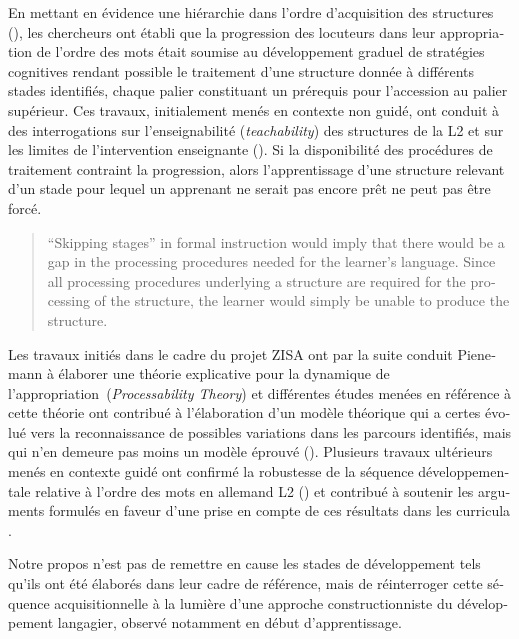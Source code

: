 \documentclass[output=paper]{langscibook}
\begin{document}
\begin{otherlanguage}{french}
En mettant en évidence une hiérarchie dans l’ordre d’acquisition des structures (), les chercheurs ont établi que la progression des locuteurs dans leur appropriation de l’ordre des mots était soumise au développement graduel de stratégies cognitives rendant possible le traitement d’une structure donnée à différents stades identifiés, chaque palier constituant un prérequis pour l’accession au palier supérieur. Ces travaux, initialement menés en contexte non guidé, ont conduit à des interrogations sur l’enseignabilité (\textit{teachability}) des structures de la L2 et sur les limites de l’intervention enseignante (\citealt{Pienemann1984, Pienemann1989, Ellis1989}). Si la disponibilité des procédures de traitement contraint la progression, alors l’apprentissage d’une structure relevant d’un stade pour lequel un apprenant ne serait pas encore prêt ne peut pas être forcé.

\begin{quote}
\begin{otherlanguage}{english}
“Skipping stages” in formal instruction would imply that there would be a gap in the processing procedures needed for the learner’s language. Since all processing procedures underlying a structure are required for the processing of the structure, the learner would simply be unable to produce the structure.\hbox{}\hfill\hbox{\citep[13]{Pienemann1999}}
\end{otherlanguage}
\end{quote}

Les travaux initiés dans le cadre du projet ZISA ont par la suite conduit Pienemann à élaborer une théorie explicative pour la dynamique de l’appropriation~(\textit{Processability Theory}) et différentes études menées en référence à cette théorie ont contribué à l’élaboration d’un modèle théorique qui a certes évolué vers la reconnaissance de possibles variations dans les parcours identifiés, mais qui n’en demeure pas moins un modèle éprouvé (\citealt{Håkansson2005, Pienemann2005, PienemannKeßler2011}). Plusieurs travaux ultérieurs menés en contexte guidé ont confirmé la robustesse de la séquence développementale relative à l’ordre des mots en allemand L2 (\citealt{Boss2004, Jansen2008, Ballestracci2010}) et contribué à soutenir les arguments formulés en faveur d’une prise en compte de ces résultats dans les curricula \citep{DiehlEtAl2000}.

Notre propos n’est pas de remettre en cause les stades de développement tels qu’ils ont été élaborés dans leur cadre de référence, mais de réinterroger cette séquence acquisitionnelle à la lumière d’une approche constructionniste du développement langagier, observé notamment en début d’apprentissage.


\end{otherlanguage}
\end{document}
